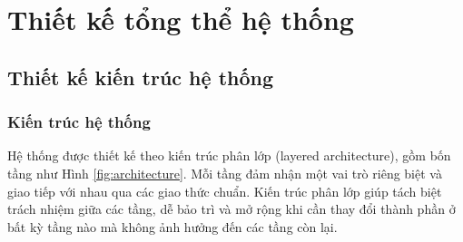 \section{Thiết kế tổng thể hệ thống}

\subsection{Thiết kế kiến trúc hệ thống}

\subsubsection{Kiến trúc hệ thống}

\hspace{0.5cm} Hệ thống được thiết kế theo kiến trúc phân lớp (layered architecture), gồm bốn tầng như Hình \ref{fig:architecture}. Mỗi tầng đảm nhận một vai trò riêng biệt và giao tiếp với nhau qua các giao thức chuẩn. Kiến trúc phân lớp giúp tách biệt trách nhiệm giữa các tầng, dễ bảo trì và mở rộng khi cần thay đổi thành phần ở bất kỳ tầng nào mà không ảnh hưởng đến các tầng còn lại.

